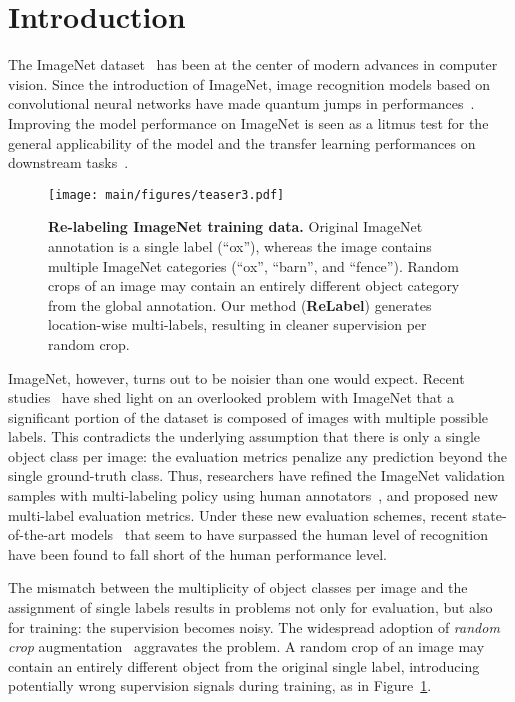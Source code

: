 \documentclass[final]{cvpr}
\newcommand\oursb{{\textbf{\mbox{ReLabel}}}\xspace}
\begin{document}
\section{Introduction}
The ImageNet dataset~\cite{ImageNet} has been at the center of modern advances in computer vision.
Since the introduction of ImageNet,
image recognition models based on convolutional neural networks have made quantum jumps in performances~\cite{alexnet, VGG, resnet}.
Improving the model performance on ImageNet is seen as a litmus test for the general applicability of the model and the transfer learning performances on downstream tasks~\cite{kornblith2019better,yun2019cutmix}.

\begin{figure}[t]
\small
\centering
\texttt{[image: main/figures/teaser3.pdf]}
\caption{\textbf{Re-labeling ImageNet training data.} 
Original ImageNet annotation is a single label (``ox''), whereas the image contains multiple ImageNet categories (``ox'', ``barn'', and ``fence''). 
Random crops of an image may contain an entirely different object category from the global annotation. 
Our method (\oursb) generates location-wise multi-labels, resulting in cleaner supervision per random crop.
}
\label{fig:teaser}
\vspace{-0.2cm}
\end{figure}

ImageNet, however, turns out to be noisier than one would expect. Recent studies~\cite{stock2018convnets,tsipras2020imagenet_madry,beyer2020are_we_done,shanker2020machine_accuracy} have shed light on an overlooked problem with ImageNet that a significant portion of the dataset is composed of images with multiple possible labels. This contradicts the underlying assumption that there is only a single object class per image: the evaluation metrics penalize any prediction beyond the single ground-truth class. 
Thus, researchers have refined the ImageNet validation samples with multi-labeling policy using human annotators~\cite{beyer2020are_we_done,shanker2020machine_accuracy}, and proposed new multi-label evaluation metrics.
Under these new evaluation schemes, recent state-of-the-art models~\cite{xie2020noisy_student,touvron2019fixing} that seem to have surpassed the human level of recognition have been found to fall short of the human performance level.



The mismatch between the multiplicity of object classes per image and the assignment of single labels results in problems not only for evaluation, but also for training: the supervision becomes noisy.
The widespread adoption of \textit{random crop} augmentation~\cite{GoogleNet} aggravates the problem. 
A random crop of an image may contain an entirely different object from the original single label, introducing potentially wrong supervision signals during training, as in Figure~\ref{fig:teaser}. 
\end{document}
